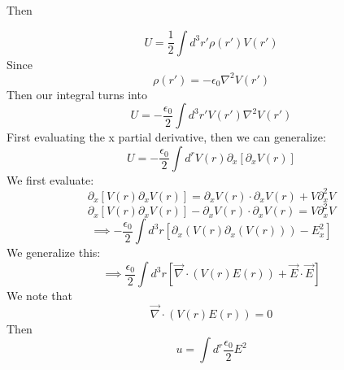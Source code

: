 \documentclass{article}
\newtheorem{one minute paper}[theorem]{One Minute Paper}
\begin{document}
Then 

\begin{equation}
    U = \frac{1}{2}\int d^{3}r' \rho(r')V(r')
\end{equation}
Since 
\begin{equation}
    \rho(r') = -\epsilon_0\nabla^{2}V(r')
\end{equation}
Then our integral turns into 
\begin{equation}
    U = -\frac{\epsilon_0}{2}\int d^{3}r'V(r')\nabla^{2}V(r')
\end{equation}
First evaluating the x partial derivative, then we can generalize:
\begin{equation}
    U = -\frac{\epsilon_0}{2}\int d^{r}V(r)\partial_x\left[\partial_x V(r)\right]
\end{equation}
We first evaluate:
\begin{equation}
    \partial_x\left[V(r)\partial_xV(r)\right] = \partial_xV(r) \cdot \partial_xV(r) + V\partial^{2}_xV
\end{equation}
\begin{equation}
    \partial_x\left[V(r)\partial_xV(r)\right] - \partial_xV(r) \cdot \partial_xV(r) = V\partial^{2}_xV
\end{equation}
\begin{equation}
    \implies -\frac{\epsilon_0}{2}\int d^3r \left[\partial_x(V(r)\partial_x(V(r))) - E_x^2\right]
\end{equation}
We generalize this:
\begin{equation}
    \implies \frac{\epsilon_0}{2}\int  d^{3}r \left[\vec{\nabla} \cdot \left(V(r)E(r)\right) + \vec{E} \cdot \vec{E}\right]
\end{equation}
We note that 
\begin{equation}
    \vec{\nabla} \cdot \left(V(r)E(r)\right) = 0
\end{equation}
Then 
\begin{equation}
    u = \int d^{r}\frac{\epsilon_0}{2}E^{2}
\end{equation}
\end{document}
